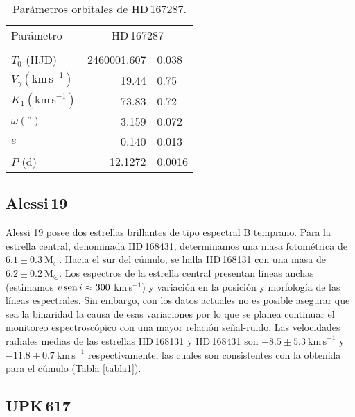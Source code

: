 \documentclass[baaa]{baaa}
\begin{document}
\begin{table}[!t]
\centering
\caption{Parámetros orbitales de HD\,167287.}
\begin{tabular}{lr@{$\pm$}l}
\hline\hline\noalign{\smallskip}
 Parámetro & 
 \multicolumn{2}{c}{HD\,167287}      \\
 \\
\hline\noalign{\smallskip}
$T_0$ (HJD)          &  2460001.607 & 0.038 \\
$V_\gamma(\mathrm{km\,s}^{-1})$ &  19.44&0.75    \\
$K_1(\mathrm{km\,s}^{-1})$      &  73.83&0.72 \\
$\omega(^\circ)$                &  3.159&0.072  \\
$e$                             &  0.140&0.013 \\
$P$ (d)                      &  12.1272&0.0016 \\
\hline
\end{tabular}
\label{tablahd167287}

\end{table}


\subsection{Alessi\,19}
Alessi 19 posee dos estrellas brillantes de tipo espectral B temprano. Para la estrella central, denominada HD\,168431, determinamos una masa fotométrica de $6.1\pm0.3~\mathrm{M_\odot}$. Hacia el sur del cúmulo, se halla HD\,168131 con una masa de $6.2\pm0.2~\mathrm{M_\odot}$. Los espectros de la estrella central presentan líneas anchas (estimamos $v\mathop{\rm sen}\nolimits i\approx 300$ km\,s$^{-1}$) y variación en la posición y morfología de las líneas espectrales. Sin embargo, con los datos actuales no es posible asegurar que sea la binaridad la causa de esas variaciones por lo que se planea continuar el monitoreo espectroscópico con una mayor relación señal-ruido. Las velocidades radiales medias de las estrellas HD\,168131 y HD\,168431 son $-8.5\pm5.3~\mathrm{km\,s}^{-1}$ y $-11.8\pm0.7~\mathrm{km\,s}^{-1}$ respectivamente, las cuales son consistentes con la obtenida  para el cúmulo (Tabla \ref{tabla1}).   

\subsection{UPK\,617} \label{upk617}
\end{document}
